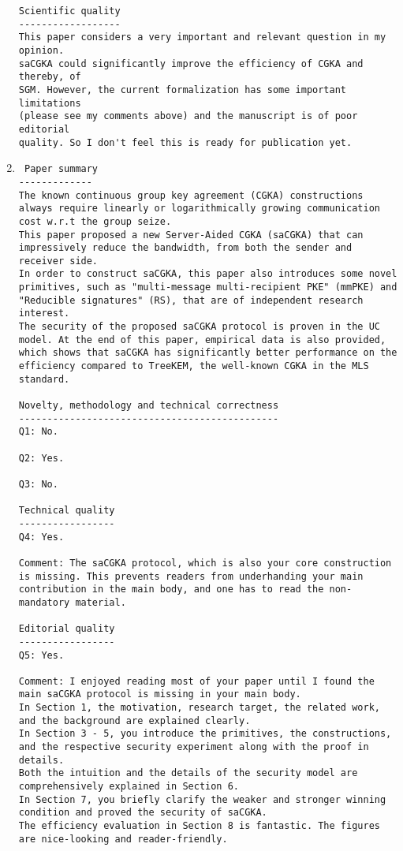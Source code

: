 \documentclass[letterpaper,10pt]{article}
\begin{document}
\begin{enumerate}[label=(\Alph*)]
\begin{verbatim}
Scientific quality
------------------
This paper considers a very important and relevant question in my opinion.
saCGKA could significantly improve the efficiency of CGKA and thereby, of
SGM. However, the current formalization has some important limitations
(please see my comments above) and the manuscript is of poor editorial
quality. So I don't feel this is ready for publication yet.
\end{verbatim}

\item
\begin{verbatim} Paper summary
-------------
The known continuous group key agreement (CGKA) constructions always require linearly or logarithmically growing communication cost w.r.t the group seize.
This paper proposed a new Server-Aided CGKA (saCGKA) that can impressively reduce the bandwidth, from both the sender and receiver side.
In order to construct saCGKA, this paper also introduces some novel primitives, such as "multi-message multi-recipient PKE" (mmPKE) and "Reducible signatures" (RS), that are of independent research interest.
The security of the proposed saCGKA protocol is proven in the UC model. At the end of this paper, empirical data is also provided, which shows that saCGKA has significantly better performance on the efficiency compared to TreeKEM, the well-known CGKA in the MLS standard.

Novelty, methodology and technical correctness
----------------------------------------------
Q1: No.

Q2: Yes.

Q3: No.

Technical quality
-----------------
Q4: Yes.

Comment: The saCGKA protocol, which is also your core construction is missing. This prevents readers from underhanding your main contribution in the main body, and one has to read the non-mandatory material.

Editorial quality
-----------------
Q5: Yes.

Comment: I enjoyed reading most of your paper until I found the main saCGKA protocol is missing in your main body.
In Section 1, the motivation, research target, the related work, and the background are explained clearly.
In Section 3 - 5, you introduce the primitives, the constructions, and the respective security experiment along with the proof in details.
Both the intuition and the details of the security model are comprehensively explained in Section 6.
In Section 7, you briefly clarify the weaker and stronger winning condition and proved the security of saCGKA.
The efficiency evaluation in Section 8 is fantastic. The figures are nice-looking and reader-friendly.


\end{verbatim}
\end{enumerate}
\end{document}

